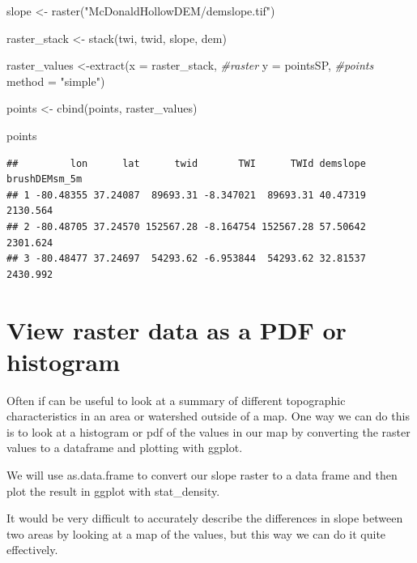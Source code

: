 \documentclass[
]{book}
\newenvironment{Shaded}{\begin{snugshade}}{\end{snugshade}}
\newcommand{\AttributeTok}[1]{\textcolor[rgb]{0.77,0.63,0.00}{#1}}
\newcommand{\CommentTok}[1]{\textcolor[rgb]{0.56,0.35,0.01}{\textit{#1}}}
\newcommand{\FunctionTok}[1]{\textcolor[rgb]{0.00,0.00,0.00}{#1}}
\newcommand{\NormalTok}[1]{#1}
\newcommand{\OtherTok}[1]{\textcolor[rgb]{0.56,0.35,0.01}{#1}}
\newcommand{\StringTok}[1]{\textcolor[rgb]{0.31,0.60,0.02}{#1}}
\begin{document}
\begin{Shaded}
\begin{Highlighting}[]
\NormalTok{slope }\OtherTok{\textless{}{-}} \FunctionTok{raster}\NormalTok{(}\StringTok{"McDonaldHollowDEM/demslope.tif"}\NormalTok{)}

\NormalTok{raster\_stack }\OtherTok{\textless{}{-}} \FunctionTok{stack}\NormalTok{(twi, twid, slope, dem)}

\NormalTok{raster\_values }\OtherTok{\textless{}{-}}\FunctionTok{extract}\NormalTok{(}\AttributeTok{x =}\NormalTok{ raster\_stack, }\CommentTok{\#raster }
                 \AttributeTok{y =}\NormalTok{ pointsSP, }\CommentTok{\#points}
                 \AttributeTok{method =} \StringTok{"simple"}\NormalTok{)}

\NormalTok{points }\OtherTok{\textless{}{-}} \FunctionTok{cbind}\NormalTok{(points, raster\_values)}

\NormalTok{points}
\end{Highlighting}
\end{Shaded}

\begin{verbatim}
##         lon      lat      twid       TWI      TWId demslope brushDEMsm_5m
## 1 -80.48355 37.24087  89693.31 -8.347021  89693.31 40.47319      2130.564
## 2 -80.48705 37.24570 152567.28 -8.164754 152567.28 57.50642      2301.624
## 3 -80.48477 37.24697  54293.62 -6.953844  54293.62 32.81537      2430.992
\end{verbatim}

\hypertarget{view-raster-data-as-a-pdf-or-histogram}{%
\section{View raster data as a PDF or histogram}\label{view-raster-data-as-a-pdf-or-histogram}}

Often if can be useful to look at a summary of different topographic characteristics in an area or watershed outside of a map. One way we can do this is to look at a histogram or pdf of the values in our map by converting the raster values to a dataframe and plotting with ggplot.

We will use as.data.frame to convert our slope raster to a data frame and then plot the result in ggplot with stat\_density.

It would be very difficult to accurately describe the differences in slope between two areas by looking at a map of the values, but this way we can do it quite effectively.
\end{document}

